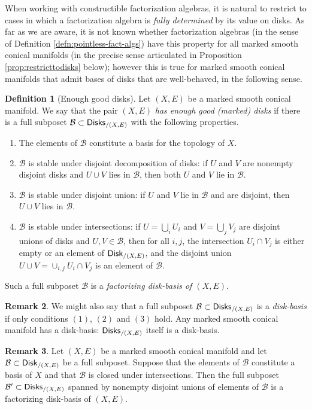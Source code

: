 \documentclass[10pt, reqno, twoside
, final
]{amsart}
\numberwithin{equation}{subsection}%
\theoremstyle{definition}
\newtheorem{defn}{Definition}[subsection]
\theoremstyle{definition}
\theoremstyle{definition}
\theoremstyle{definition}
\theoremstyle{definition}
\theoremstyle{definition}
\theoremstyle{definition}
\theoremstyle{definition}
\theoremstyle{definition}
\theoremstyle{plain}
\theoremstyle{definition}
\theoremstyle{plain}
\theoremstyle{definition}
\theoremstyle{plain}
\theoremstyle{definition}
\newtheorem{rmk}[defn]{Remark}
\theoremstyle{definition}
\theoremstyle{plain}
\theoremstyle{plain}
\theoremstyle{definition}
\theoremstyle{plain}
\theoremstyle{plain}
\theoremstyle{plain}
\begin{document}
When working with constructible factorization algebras, it is natural to restrict to cases in which a factorization algebra is \emph{fully determined} by its value on disks. As far as we are aware, it is not known whether factorization algebras (in the sense of Definition \ref{defn:pointless-fact-algs}) have this property for all marked smooth conical manifolds (in the precise sense articulated in Proposition \ref{prop:restricttodisks} below); however this is true for marked smooth conical manifolds that admit bases of disks that are well-behaved, in the following sense.
\begin{defn}[Enough good disks]\label{defn:factorizingdiskbasis}
Let $(X,E)$ be a marked smooth conical manifold. We say that the pair $(X,E)$ \emph{has enough good (marked) disks} if there is a full subposet $\mathcal{B}\subset \mathsf{Disks}_{/(X,E)}$ with the following properties.
\begin{enumerate}[$(1)$]
    \item The elements of $\mathcal{B}$ constitute a basis for the topology of $X$.
    \item $\mathcal{B}$ is stable under disjoint decomposition of disks: if $U$ and $V$ are nonempty disjoint disks and $U\cup V$ lies in $\mathcal{B}$, then both $U$ and $V$ lie in $\mathcal{B}$.
    \item $\mathcal{B}$ is stable under disjoint union: if $U$ and $V$ lie in $\mathcal{B}$ and are disjoint, then $U\cup V$ lies in $\mathcal{B}$.
    \item $\mathcal{B}$ is stable under intersections: if $U=\bigcup_iU_i$ and $V=\bigcup_jV_j$ are disjoint unions of disks and $U,V\in\mathcal{B}$, then for all $i,j$, the intersection $U_i\cap V_j$ is either empty or an element of $\mathsf{Disk}_{/(X,E)}$, and the disjoint union $U\cup V=\cup_{i,j}U_i\cap V_j$ is an element of $\mathcal{B}$.
\end{enumerate}
Such a full subposet $\mathcal{B}$ is a \emph{factorizing disk-basis of $(X,E)$}.
\end{defn}
\begin{rmk}\label{rmk:diskbasis}
We might also say that a full subposet $\mathcal{B}\subset \mathsf{Disks}_{/(X,E)}$ is a \emph{disk-basis} if only conditions $(1)$, $(2)$ and $(3)$ hold. Any marked smooth conical manifold has a disk-basis: $\mathsf{Disks}_{/(X,E)}$ itself is a disk-basis.    
\end{rmk}
\begin{rmk}\label{rmk:factorizingbasiscriterion}
Let $(X,E)$ be a marked smooth conical manifold and let $\mathcal{B}\subset\mathsf{Disk}_{/(X,E)}$ be a full subposet. Suppose that the elements of $\mathcal{B}$ constitute a basis of $X$ and that $\mathcal{B}$ is closed under intersections. Then the full subposet $\mathcal{B}'\subset \mathsf{Disks}_{/(X,E)}$ spanned by nonempty disjoint unions of elements of $\mathcal{B}$ is a factorizing disk-basis of $(X,E)$. 
\end{rmk}
\end{document}
